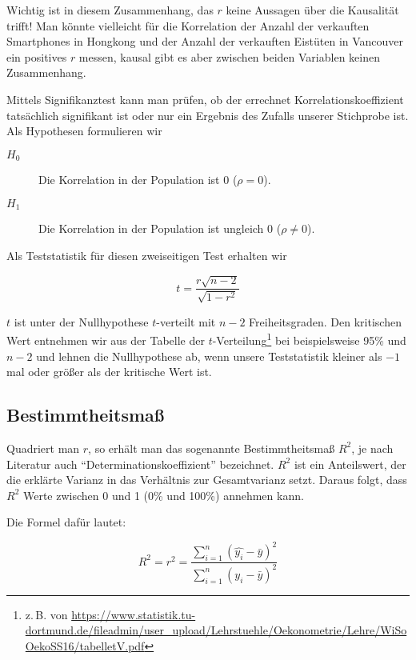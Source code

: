 \documentclass[ngerman, 12pt]{scrartcl}
\begin{document}
Wichtig ist in diesem Zusammenhang, das \(r\) keine Aussagen über die Kausalität trifft! Man könnte vielleicht für die Korrelation der Anzahl der verkauften Smartphones in Hongkong und der Anzahl der verkauften Eistüten in Vancouver ein positives \(r\) messen, kausal gibt es aber zwischen beiden Variablen keinen Zusammenhang.

Mittels Signifikanztest kann man prüfen, ob der errechnet Korrelationskoeffizient tatsächlich signifikant ist oder nur ein Ergebnis des Zufalls unserer Stichprobe ist. Als Hypothesen formulieren wir

\begin{description}
\item[\(H_0\)] Die Korrelation in der Population ist 0 (\(\rho =0\)).
\item[\(H_1\)] Die Korrelation in der Population ist ungleich 0 (\(\rho\not=0\)).
\end{description}

Als Teststatistik für diesen zweiseitigen Test erhalten wir 

\begin{equation}
t = \frac{r\sqrt{n-2}}{\sqrt{1-r^2}}
\end{equation}

\(t\) ist unter der Nullhypothese \(t\)-verteilt mit \(n-2\) Freiheitsgraden. Den kritischen Wert entnehmen wir aus der Tabelle der \(t\)-Verteilung\footnote{z.\,B. von \url{https://www.statistik.tu-dortmund.de/fileadmin/user_upload/Lehrstuehle/Oekonometrie/Lehre/WiSoOekoSS16/tabelletV.pdf}} bei beispielsweise 95\% und \(n-2\)
und lehnen die Nullhypothese ab, wenn unsere Teststatistik kleiner als \(-1\) mal oder größer als der kritische Wert ist.


\subsection{Bestimmtheitsmaß}

Quadriert man \(r\), so erhält man das sogenannte Bestimmtheitsmaß \(R^2\), je nach Literatur auch \enquote{Determinationskoeffizient} bezeichnet. \(R^2\) ist ein Anteilswert, der die erklärte Varianz in das Verhältnis zur Gesamtvarianz setzt. Daraus folgt, dass \(R^2\) Werte zwischen 0 und 1 (0\% und 100\%) annehmen kann. 

Die Formel dafür lautet:

\begin{equation}
R^2 = r^2 = \frac{\sum_{i=1}^n (\hat{y_i} - \bar{y})^2} {\sum_{i=1}^n (y_i - \bar{y})^2}
\end{equation}
\end{document}
